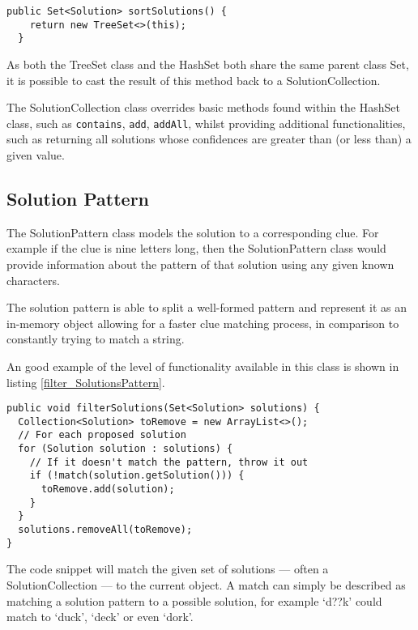 \begin{lstlisting}[caption={Method returns a new sorted collection},
                   label=sortSolutions_SolutionsCollection] 
  public Set<Solution> sortSolutions() {
    return new TreeSet<>(this);
  }
\end{lstlisting}

As both the TreeSet class and the HashSet both share the same parent class Set,
it is possible to cast the result of this method back to a SolutionCollection.

The SolutionCollection class overrides basic methods found within the HashSet 
class, such as \texttt{contains}, \texttt{add}, \texttt{addAll}, whilst 
providing additional functionalities, such as returning all solutions whose 
confidences are greater than (or less than) a given value.


\subsection{Solution Pattern}
\label{sub:solution_pattern}

The SolutionPattern class models the solution to a corresponding clue. For 
example if the clue is nine letters long, then the SolutionPattern class would 
provide information about the pattern of that solution using any given known 
characters.

The solution pattern is able to split a well-formed pattern and represent it 
as an in-memory object allowing for a faster clue matching process, in 
comparison to constantly trying to match a string.

An good example of the level of functionality available in this class is shown 
in listing \ref{filter_SolutionsPattern}.

\begin{lstlisting}[caption={Method returns collection of matched solutions},
                   label=filter_SolutionsPattern] 
public void filterSolutions(Set<Solution> solutions) {
  Collection<Solution> toRemove = new ArrayList<>();
  // For each proposed solution
  for (Solution solution : solutions) {
    // If it doesn't match the pattern, throw it out
    if (!match(solution.getSolution())) {
      toRemove.add(solution);
    }
  }
  solutions.removeAll(toRemove);
}
\end{lstlisting}  

The code snippet will match the given set of solutions --- often a 
SolutionCollection --- to the current object. A match can simply be described as
matching a solution pattern to a possible solution, for example `d??k' could 
match to `duck', `deck' or even `dork'.

